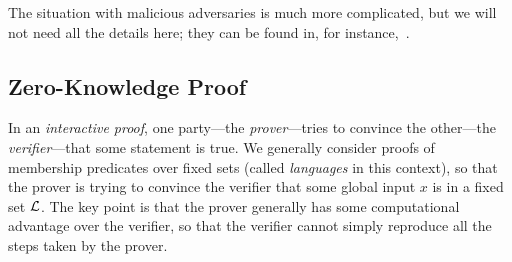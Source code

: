 The situation with malicious adversaries is much more complicated, but we will
not need all the details here; they can be found in, for instance,~\cite[Section
4]{lindell-2017}.




\subsection{Zero-Knowledge Proof}

In an \emph{interactive proof}, one party---the \emph{prover}---tries to
convince the other---the \emph{verifier}---that some statement is true. We
generally consider proofs of membership predicates over fixed sets (called
\emph{languages} in this context), so that the prover is trying to convince the
verifier that some global input $x$ is in a fixed set $\mathcal{L}$. The key point is
that the prover generally has some computational advantage over the verifier, so
that the verifier cannot simply reproduce all the steps taken by the prover.

